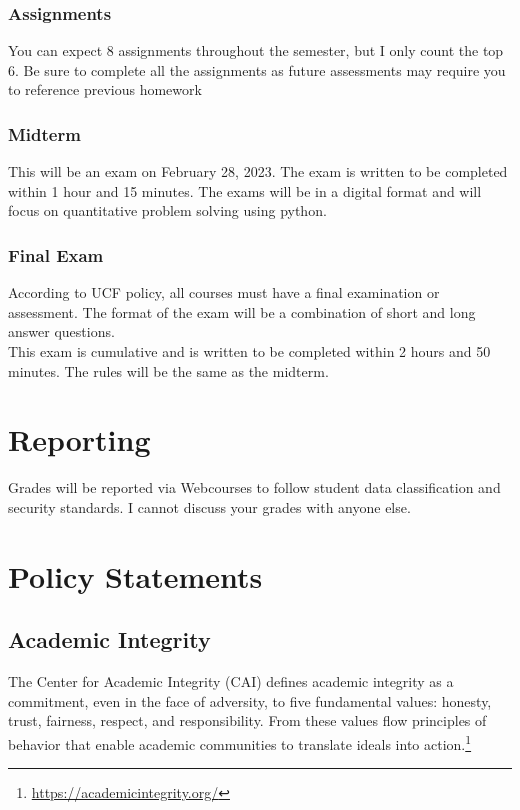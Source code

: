 \documentclass[11pt]{paper}
\begin{document}
\subsubsection{Assignments}
You can expect 8 assignments throughout the semester, but I only count the top 6. Be sure to complete all the assignments as future assessments may require you to reference previous homework

\subsubsection{Midterm}
This will be an exam on February 28, 2023. The exam is written to be completed within 1 hour and 15 minutes. The exams will be in a digital format and will focus on quantitative problem solving using python.

\subsubsection{Final Exam}
According to UCF policy, all courses must have a final examination or assessment. The format of the exam will be a combination of short and long answer questions.\\

This exam is cumulative and is written to be completed within 2 hours and 50 minutes. The rules will be the same as the midterm.

\section{Reporting}
Grades will be reported via Webcourses to follow student data classification and security standards. I cannot discuss your grades with anyone else.

\section{Policy Statements}
\subsection{Academic Integrity}
The Center for Academic Integrity (CAI) defines academic integrity as a commitment, even in the face of adversity, to five fundamental values: honesty, trust, fairness, respect, and responsibility. From these values flow principles of behavior that enable academic communities to translate ideals into action.\footnote{\url{https://academicintegrity.org/}}\\
\end{document}
